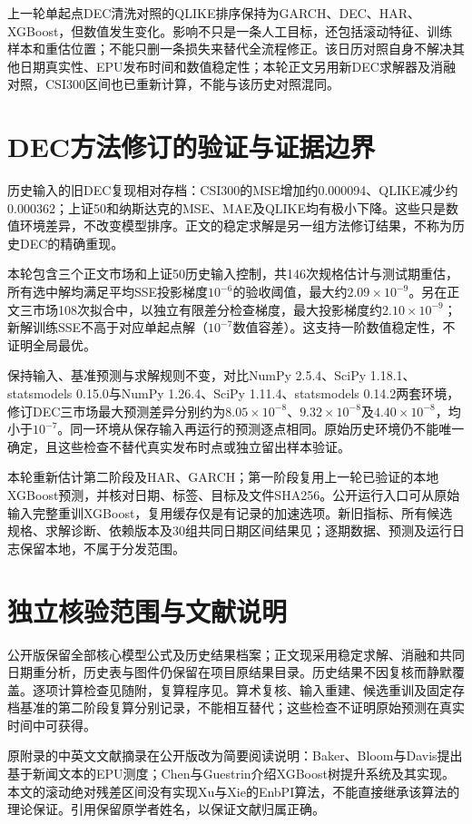 上一轮单起点DEC清洗对照的QLIKE排序保持为GARCH、DEC、HAR、XGBoost，但数值发生变化。影响不只是一条人工目标，还包括滚动特征、训练样本和重估位置；不能只删一条损失来替代全流程修正。该日历对照自身不解决其他日期真实性、EPU发布时间和数值稳定性；本轮正文另用新DEC求解器及消融对照，CSI300区间也已重新计算，不能与该历史对照混同。

\section{DEC方法修订的验证与证据边界}
历史输入的旧DEC复现相对存档：CSI300的MSE增加约0.000094、QLIKE减少约0.000362；上证50和纳斯达克的MSE、MAE及QLIKE均有极小下降。这些只是数值环境差异，不改变模型排序。正文的稳定求解是另一组方法修订结果，不称为历史DEC的精确重现。

本轮包含三个正文市场和上证50历史输入控制，共146次规格估计与测试期重估，所有选中解均满足平均SSE投影梯度$10^{-6}$的验收阈值，最大约$2.09\times10^{-9}$。另在正文三市场108次拟合中，以独立有限差分检查梯度，最大投影梯度约$2.10\times10^{-9}$；新解训练SSE不高于对应单起点解（$10^{-7}$数值容差）。这支持一阶数值稳定性，不证明全局最优。

保持输入、基准预测与求解规则不变，对比NumPy 2.5.4、SciPy 1.18.1、statsmodels 0.15.0与NumPy 1.26.4、SciPy 1.11.4、statsmodels 0.14.2两套环境，修订DEC三市场最大预测差异分别约为$8.05\times10^{-8}$、$9.32\times10^{-8}$及$4.40\times10^{-8}$，均小于$10^{-7}$。同一环境从保存输入再运行的预测逐点相同。原始历史环境仍不能唯一确定，且这些检查不替代真实发布时点或独立留出样本验证。

本轮重新估计第二阶段及HAR、GARCH；第一阶段复用上一轮已验证的本地XGBoost预测，并核对日期、标签、目标及文件SHA256。公开运行入口可从原始输入完整重训XGBoost，复用缓存仅是有记录的加速选项。新旧指标、所有候选规格、求解诊断、依赖版本及30组共同日期区间结果见；逐期数据、预测及运行日志保留本地，不属于分发范围。

\section{独立核验范围与文献说明}
公开版保留全部核心模型公式及历史结果档案；正文现采用稳定求解、消融和共同日期重分析，历史表与图件仍保留在项目原结果目录。历史结果不因复核而静默覆盖。逐项计算检查见随附，复算程序见。算术复核、输入重建、候选重训及固定存档基准的第二阶段复算分别记录，不能相互替代；这些检查不证明原始预测在真实时间中可获得。

原附录的中英文文献摘录在公开版改为简要阅读说明：Baker、Bloom与Davis提出基于新闻文本的EPU测度\citep{BakerBloomDavis2016}；Chen与Guestrin介绍XGBoost树提升系统及其实现\citep{ChenGuestrin2016}。本文的滚动绝对残差区间没有实现Xu与Xie的EnbPI算法，不能直接继承该算法的理论保证\citep{XuXie2021}。引用保留原学者姓名，以保证文献归属正确。

